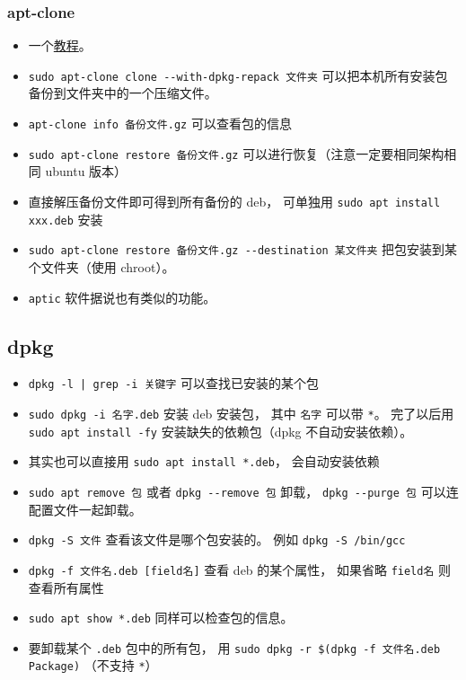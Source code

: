 \subsubsection{apt-clone}
\begin{itemize}
\item 一个\href{https://ubunlog.com/en/apt-clone-copia-seguridad-paquetes/}{教程}。
\item \verb`sudo apt-clone clone --with-dpkg-repack 文件夹` 可以把本机所有安装包备份到文件夹中的一个压缩文件。
\item \verb`apt-clone info 备份文件.gz` 可以查看包的信息
\item \verb`sudo apt-clone restore 备份文件.gz` 可以进行恢复（注意一定要相同架构相同 ubuntu 版本）
\item 直接解压备份文件即可得到所有备份的 deb， 可单独用 \verb`sudo apt install xxx.deb` 安装
\item \verb`sudo apt-clone restore 备份文件.gz --destination 某文件夹` 把包安装到某个文件夹（使用 chroot）。
\item \verb`aptic` 软件据说也有类似的功能。
\end{itemize}



\subsection{dpkg}
\begin{itemize}
\item \verb`dpkg -l | grep -i 关键字` 可以查找已安装的某个包
\item \verb`sudo dpkg -i 名字.deb` 安装 deb 安装包， 其中 \verb`名字` 可以带 \verb`*`。 完了以后用 \verb`sudo apt install -fy` 安装缺失的依赖包（dpkg 不自动安装依赖）。
\item 其实也可以直接用 \verb`sudo apt install *.deb`， 会自动安装依赖
\item \verb`sudo apt remove 包` 或者 \verb`dpkg --remove 包` 卸载， \verb`dpkg --purge 包` 可以连配置文件一起卸载。
\item \verb`dpkg -S 文件` 查看该文件是哪个包安装的。 例如 \verb`dpkg -S /bin/gcc`
\item \verb`dpkg -f 文件名.deb [field名]` 查看 deb 的某个属性， 如果省略 \verb`field名` 则查看所有属性
\item \verb`sudo apt show *.deb` 同样可以检查包的信息。
\item 要卸载某个 \verb`.deb` 包中的所有包， 用 \verb`sudo dpkg -r $(dpkg -f 文件名.deb Package)` （不支持 \verb`*`）
\end{itemize}

